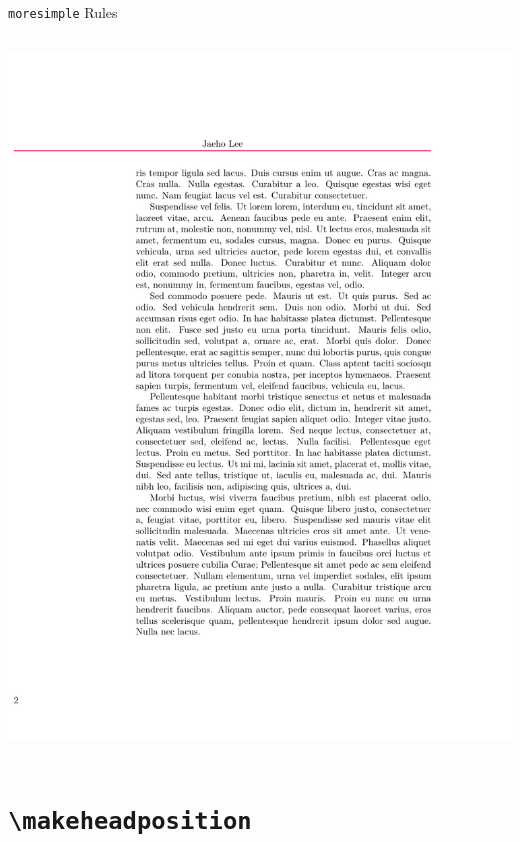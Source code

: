 \documentclass{beamer}
\begin{document}
\begin{frame}[fragile]{\texttt{moresimple} Rules}
\begin{columns}
\begin{column}{0.4\textwidth}
\begin{overprint}
        \includegraphics[frame,width=\linewidth]{moresimple-rw-2}
      \end{overprint}
    \end{column}
  \end{columns}
\end{frame}


\section{\texttt{\textbackslash makeheadposition}}
\end{document}
